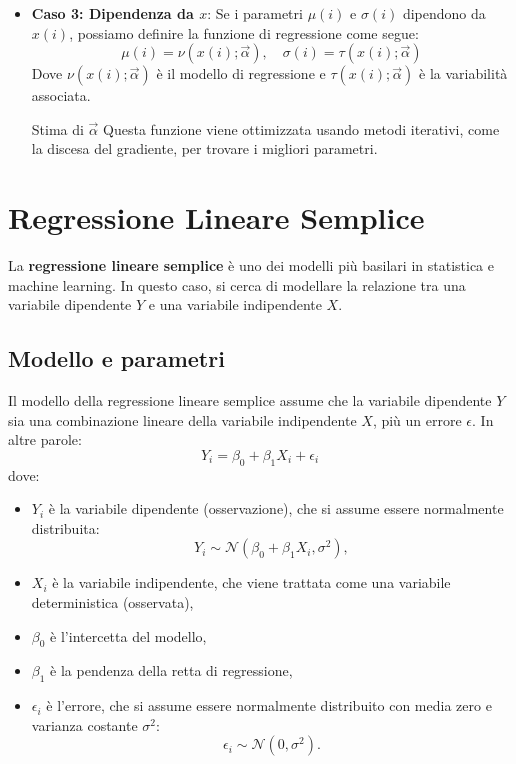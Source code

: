 \begin{itemize}
    \item \textbf{Caso 3: Dipendenza da \( x \)}: Se i parametri \( \mu(i) \) e \( \sigma(i) \) dipendono da \( x(i) \), possiamo definire la funzione di regressione come segue:
        \[
            \mu(i) = \nu(x(i); \vec{\alpha}), \quad \sigma(i) = \tau(x(i); \vec{\alpha})
        \]
        Dove \( \nu(x(i); \vec{\alpha}) \) è il modello di regressione e \( \tau(x(i); \vec{\alpha}) \) è la variabilità associata.

        \begin{nota}{Stima di $\vec{\alpha}$}{}
            Questa funzione viene ottimizzata usando metodi iterativi, come la discesa
            del gradiente, per trovare i migliori parametri.
        \end{nota}
\end{itemize}



\section{Regressione Lineare Semplice}\label{sec:regressione}

La \textbf{regressione lineare semplice} è uno dei modelli più basilari in statistica e machine learning. In questo caso, si cerca di modellare la relazione tra una variabile dipendente \( Y \) e una variabile indipendente \( X \).

\subsection{Modello e parametri}

Il modello della regressione lineare semplice assume che la variabile dipendente \( Y \) sia una combinazione lineare della variabile indipendente \( X \), più un errore \( \epsilon \). In altre parole:
\[
Y_i = \beta_0 + \beta_1 X_i + \epsilon_i
\]
dove:
\begin{itemize}
\item \( Y_i \) è la variabile dipendente (osservazione), che si assume essere normalmente distribuita: 
    \[ Y_i \sim \mathcal{N}(\beta_0 + \beta_1 X_i, \sigma^2), \]
\item \( X_i \) è la variabile indipendente, che viene trattata come una variabile deterministica (osservata),
\item \( \beta_0 \) è l'intercetta del modello,
\item \( \beta_1 \) è la pendenza della retta di regressione,
\item \( \epsilon_i \) è l'errore, che si assume essere normalmente distribuito con media zero e varianza costante \( \sigma^2 \):
        \[ \epsilon_i \sim \mathcal{N}(0, \sigma^2). \]
\end{itemize}

